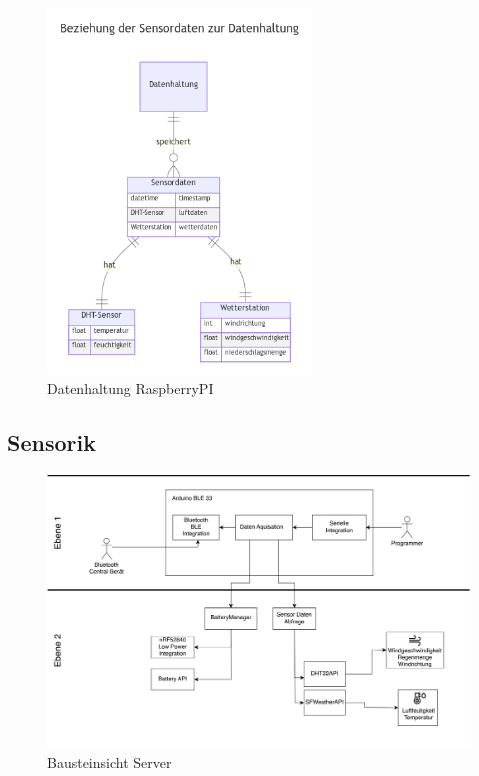 \documentclass[
]{article}
\begin{document}
\begin{figure}[H]
	\centering
	\includegraphics[width=70mm]{resources/erDiagram-sensordaten-datenhaltung.png}
	\caption{Datenhaltung RaspberryPI}
	\label{fig:Datenhaltung}
\end{figure}  


\subsection{Sensorik}
\begin{figure}[H]
	\centering
	\includegraphics[width=130mm]{resources/Bausteinschicht_Sara.png}
	\caption{Bausteinsicht Server}
	\label{fig:BausteinSensorik}
\end{figure}  
\end{document}
